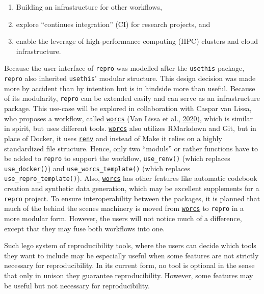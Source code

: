 \documentclass[12pt,a4paper,]{article}
\providecommand{\tightlist}{%
  \setlength{\itemsep}{0pt}\setlength{\parskip}{0pt}}
\begin{document}
\begin{enumerate}
\def\labelenumi{\arabic{enumi}.}
\tightlist
\item
  Building an infrastructure for other workflows,
\item
  explore ``continues integration'' (CI) for research projects, and
\item
  enable the leverage of high-performance computing (HPC) clusters and cloud infrastructure.
\end{enumerate}

Because the user interface of \texttt{repro} was modelled after the \texttt{usethis} package, \texttt{repro} also inherited \texttt{usethis}' modular structure.
This design decision was made more by accident than by intention but is in hindside more than useful.
Because of its modularity, \texttt{repro} can be extended easily and can serve as an infrastructure package.
This use-case will be explored in collaboration with Caspar van Lissa, who proposes a workflow, called \href{https://cjvanlissa.github.io/worcs/}{\texttt{worcs}} (Van Lissa et al., \protect\hyperlink{ref-vanlissaWORCSWorkflowOpen2020}{2020}), which is similar in spirit, but uses different tools.
\href{https://cjvanlissa.github.io/worcs/}{\texttt{worcs}} also utilizes RMarkdown and Git, but in place of Docker, it uses \href{https://rstudio.github.io/renv/articles/renv.html}{\texttt{renv}} and instead of Make it relies on a highly standardized file structure.
Hence, only two ``moduls'' or rather functions have to be added to \texttt{repro} to support the workflow, \texttt{use\_renv()} (which replaces \texttt{use\_docker()}) and \texttt{use\_worcs\_template()} (which replaces \texttt{use\_repro\_template()}).
Also, \href{https://cjvanlissa.github.io/worcs/}{\texttt{worcs}} has other features like automatic codebook creation and synthetic data generation, which may be excellent supplements for a \texttt{repro} project.
To ensure interoperability between the packages, it is planned that much of the behind the scenes machinery is moved from \href{https://cjvanlissa.github.io/worcs/}{\texttt{worcs}} to \texttt{repro} in a more modular form.
However, the users will not notice much of a difference, except that they may fuse both workflows into one.

Such lego system of reproducibility tools, where the users can decide which tools they want to include may be especially useful when some features are not strictly necessary for reproducibility.
In its current form, no tool is optional in the sense that only in unison they guarantee reproducibility.
However, some features may be useful but not necessary for reproducibility.
\end{document}
